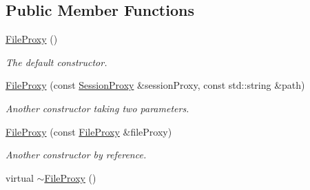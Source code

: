 \subsection*{Public Member Functions}
\begin{DoxyCompactItemize}
\item 
\hypertarget{classFileProxy_a242f019c3c3fa62ae71b3b4c69ee7dee}{
\hyperlink{classFileProxy_a242f019c3c3fa62ae71b3b4c69ee7dee}{FileProxy} ()}
\label{classFileProxy_a242f019c3c3fa62ae71b3b4c69ee7dee}

\begin{DoxyCompactList}\small\item\em The default constructor. \item\end{DoxyCompactList}\item 
\hyperlink{classFileProxy_a682e269e39987367b23affb11eea9319}{FileProxy} (const \hyperlink{classSessionProxy}{SessionProxy} \&sessionProxy, const std::string \&path)
\begin{DoxyCompactList}\small\item\em Another constructor taking two parameters. \item\end{DoxyCompactList}\item 
\hyperlink{classFileProxy_a7b4434df0b78ccaf9a2c8e21d9f30492}{FileProxy} (const \hyperlink{classFileProxy}{FileProxy} \&fileProxy)
\begin{DoxyCompactList}\small\item\em Another constructor by reference. \item\end{DoxyCompactList}\item 
\hypertarget{classFileProxy_aa83e65aea0228b1015decb77f14597c2}{
virtual \hyperlink{classFileProxy_aa83e65aea0228b1015decb77f14597c2}{$\sim$FileProxy} ()}
\label{classFileProxy_aa83e65aea0228b1015decb77f14597c2}


\end{DoxyCompactItemize}
